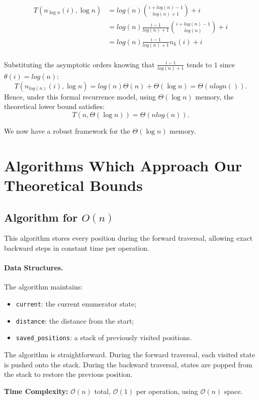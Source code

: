 \documentclass[a4paper,10pt]{article}
\begin{document}
\[
\begin{aligned}
T(n_{\log n}(i), \log n)
  &= log(n) \binom{i + log(n) - 1}{log(n) + 1} + i \\
  &= log(n)  \frac{i-1}{log(n) +1}  \binom{i + log(n) - 1}{log(n)} + i\\
  &= log(n)  \frac{i-1}{log(n) +1}  n_{k}(i) + i\\
\end{aligned}
\]

Substituting the asymptotic orders knowing that $\frac{i-1}{log(n) + 1}$ tends to $1$ since $\theta(i) = log(n)$:
\[
T(n_{log(n)}(i), \log n) = log(n) \Theta(n) + \Theta(\log n) = \Theta(nlogn()).
\]
Hence, under this formal recurrence model, using \(\Theta(\log n)\) memory, the theoretical lower bound satisfies:
\[
T(n, \Theta(\log n)) = \Theta(nlog(n)).
\]

We now have a robust framework for the \(\Theta(\log n)\) memory.
\section{Algorithms Which Approach Our Theoretical Bounds}

\subsection{Algorithm for $O(n)$~\cite{filliatre2006backtracking}}

This algorithm stores every position during the forward traversal, allowing
exact backward steps in constant time per operation.

\paragraph{Data Structures.} The algorithm maintains:
\begin{itemize}
    \item \texttt{current}: the current enumerator state;
    \item \texttt{distance}: the distance from the start;
    \item \texttt{saved\_positions}: a stack of previously visited positions.
\end{itemize}

The algorithm is straightforward. During the forward traversal, each visited
state is pushed onto the stack. During the backward traversal, states are
popped from the stack to restore the previous position.


\textbf{Time Complexity:} $\mathcal{O}(n)$ total, $\mathcal{O}(1)$ per operation, using $\mathcal{O}(n)$ space.
\end{document}
